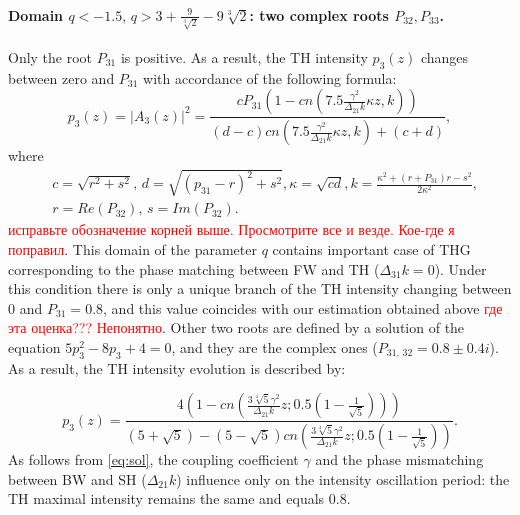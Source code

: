 \documentclass[a4paper, 12pt, onecolumn]{extarticle}
\begin{document}
\paragraph*{Domain  $q<-1.5,\,q>3 + \frac{9}{\sqrt[3]{2}}-9\sqrt[3]{ 2}$: two complex roots $P_{32},P_{33}$.}
Only the root $P_{31}$ is positive. As a result, the TH intensity  $p_3(z)$ changes between zero and $P_{31}$ with accordance of the following formula:
\begin{equation}
\label{eq:p1_1}
p_3(z)=|A_3(z)|^2=\frac{cP_{31}(1-cn(7.5\frac{\gamma^2}{\Delta_{21}k}\kappa z,k))}{(d-c)cn(7.5\frac{\gamma^2}{\Delta_{21}k}\kappa z,k)+(c+d)},
\end{equation}
where
$$
\begin{aligned}
&c=\sqrt{r^2+s^2},\, d=\sqrt{(p_{31}-r)^2+s^2}, \kappa=\sqrt{cd}, k=\frac{\kappa^2+(r+P_{31})r-s^2}{2\kappa^2},\\
&r=Re(P_{32}),\, s=Im (P_{32}).
\end{aligned}
$$
\textcolor{red}{исправьте обозначение корней выше. Просмотрите все и везде. Кое-где я поправил}. This domain of the parameter $q$ contains important case of THG corresponding to the phase matching between FW and TH ($\Delta_{31}k=0$). Under this condition there is only a unique branch of the TH intensity changing between \(0\) and $P_{31}=0.8$, and this value coincides with our estimation obtained above \textcolor{red}{где эта оценка??? Непонятно}. Other two roots are defined by a solution of the equation \(5p_3^2-8p_3+4=0\), and they are the complex ones (\(P_{31,\,32}=0.8\pm0.4i\)). 
As a result, the TH intensity evolution  is described by:

\begin{equation}
\label{eq:sol}
p_3(z)=\frac{4(1-cn(\frac{3\sqrt[4]{5}\gamma^2}{\Delta_{21}k}z; 0.5(1-\frac{1}{\sqrt{5}})))}{(5+\sqrt{5})-(5-\sqrt{5})cn(\frac{3\sqrt[4]{5}\gamma^2}{\Delta_{21}k}z; 0.5(1-\frac{1}{\sqrt{5}}))}.
\end{equation}
As follows from \eqref{eq:sol}, the coupling coefficient \(\gamma\) and the phase mismatching between BW and SH (\(\Delta_{21}k\))  influence only on the intensity oscillation period: the TH maximal intensity remains the same  and equals \(0.8\).
\end{document}
